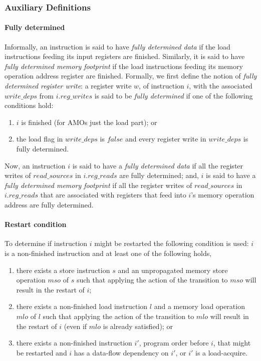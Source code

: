 \subsubsection{Auxiliary Definitions}\label{sec:omm:aux}
\paragraph{Fully determined}
Informally, an instruction is said to have {\it fully determined data} if the load instructions feeding its input registers are finished.
Similarly, it is said to have {\it fully determined memory footprint} if the load instructions feeding its memory operation address register are finished.
%
Formally, we first define the notion of {\it fully determined register write}: a register write $w$, of instruction $i$, with the associated $write\_deps$ from $i.reg\_writes$ is said to be {\it fully determined} if one of the following conditions hold:
\begin{enumerate}
\item $i$ is finished (for AMOs just the load part); or
\item the load flag in $write\_deps$ is $false$ and every register write in $write\_deps$ is fully determined.
\end{enumerate}
Now, an instruction $i$ is said to have a {\it fully determined data} if all the register writes of $read\_sources$ in $i.reg\_reads$ are fully determined;
and, $i$ is said to have a {\it fully determined memory footprint} if all the register writes of $read\_sources$ in $i.reg\_reads$ that are associated with registers that feed into $i$'s memory operation address are fully determined.


\paragraph{Restart condition}\label{omm:restart_condition}
To determine if instruction $i$ might be restarted the following condition is used: $i$ is a non-finished instruction and at least one of the following holds,
\begin{enumerate}
\item there exists a store instruction $s$ and an unpropagated memory store operation $mso$ of $s$ such that applying the action of the  transition to $mso$ will result in the restart of $i$;
\item there exists a non-finished load instruction $l$ and a memory load operation $mlo$ of $l$ such that applying the action of the  transition to $mlo$ will result in the restart of $i$ (even if $mlo$ is already satisfied); or
\item there exists a non-finished instruction $i'$, program order before $i$, that might be restarted and $i$ has a data-flow dependency on $i'$, or $i'$ is a load-acquire.
\end{enumerate}
